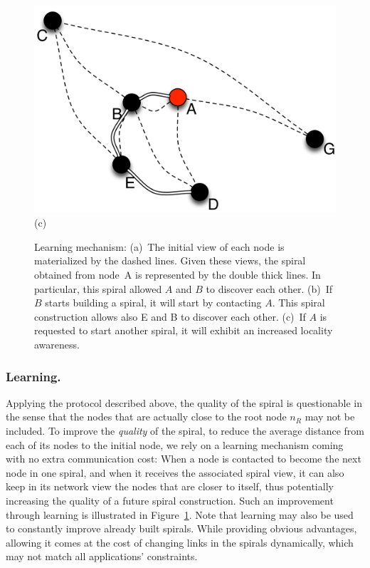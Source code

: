 \begin{figure}[ht]
{\begin{center}
{\begin{minipage}{.3\linewidth}
	  \begin{center}
	    \includegraphics[width=1.05\linewidth]{Figures/learning3.png}\\(c)
	  \end{center}
	\end{minipage}
	\caption{Learning mechanism: (a)~The initial view of each node is materialized by
          the dashed lines. Given these views, the spiral obtained from node~A is
          represented by the double thick lines. In particular, this spiral allowed $A$
          and $B$ to discover each other. (b)~If $B$ starts building a spiral, it will
          start by contacting $A$. This spiral construction allows also E and B to
          discover each other. (c)~If $A$ is requested to start another spiral, it will
          exhibit an increased locality awareness.\label{fig:learning}} }
      \end{center}
}
\vspace*{-.8cm}
\end{figure}

\subsubsection*{Learning.}

Applying the protocol described above, the quality of the spiral is questionable in the
sense that the nodes that are actually close to the root node $n_R$ may not be
included.%
%
To improve the \emph{quality} of the spiral, \ie to reduce the average
distance from each of its nodes to the initial node, we rely on a learning
mechanism coming with no extra communication cost: When a node is contacted to
become the next node in one spiral, and when it receives the associated spiral
view, it can also keep in its network view the nodes that are closer to itself,
thus potentially increasing the quality of a future spiral construction. Such an
improvement through learning is illustrated in Figure~\ref{fig:learning}. Note
that learning may also be used to constantly improve already built
spirals. While providing obvious advantages, allowing it comes at the cost of
changing links in the spirals dynamically, which may not match all applications'
constraints.

